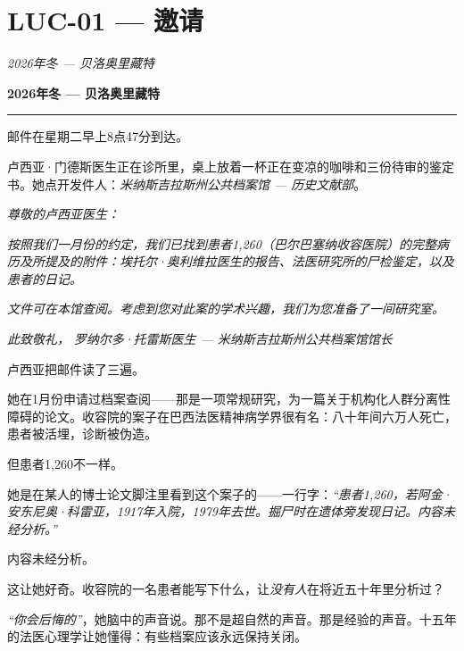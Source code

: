 \section*{\textbf{LUC-01} --- 邀请}

\noindent \textit{2026年冬 --- 贝洛奥里藏特}

\noindent \textbf{2026年冬 --- 贝洛奥里藏特}

\vspace{0.5em}\noindent\rule{\textwidth}{0.5pt}\vspace{0.5em}

\noindent 邮件在星期二早上8点47分到达。

\noindent 卢西亚·门德斯医生正在诊所里，桌上放着一杯正在变凉的咖啡和三份待审的鉴定书。她点开发件人：\textit{米纳斯吉拉斯州公共档案馆 --- 历史文献部}。

\noindent \textit{尊敬的卢西亚医生：}

\noindent \textit{按照我们一月份的约定，我们已找到患者1,260（巴尔巴塞纳收容医院）的完整病历及所提及的附件：埃托尔·奥利维拉医生的报告、法医研究所的尸检鉴定，以及患者的日记。}

\noindent \textit{文件可在本馆查阅。考虑到您对此案的学术兴趣，我们为您准备了一间研究室。}

\noindent \textit{此致敬礼，}
\noindent \textit{罗纳尔多·托雷斯医生 --- 米纳斯吉拉斯州公共档案馆馆长}

\noindent 卢西亚把邮件读了三遍。

\noindent 她在1月份申请过档案查阅——那是一项常规研究，为一篇关于机构化人群分离性障碍的论文。收容院的案子在巴西法医精神病学界很有名：八十年间六万人死亡，患者被活埋，诊断被伪造。

\noindent 但患者1,260不一样。

\noindent 她是在某人的博士论文脚注里看到这个案子的——一行字：\textit{\textquotedblleft{}患者1,260，若阿金·安东尼奥·科雷亚，1917年入院，1979年去世。掘尸时在遗体旁发现日记。内容未经分析。\textquotedblright{}}

\noindent 内容未经分析。

\noindent 这让她好奇。收容院的一名患者能写下什么，让\textit{没有人}在将近五十年里分析过？

\noindent \textit{\textquotedblleft{}你会后悔的\textquotedblright{}}，她脑中的声音说。那不是超自然的声音。那是经验的声音。十五年的法医心理学让她懂得：有些档案应该永远保持关闭。

